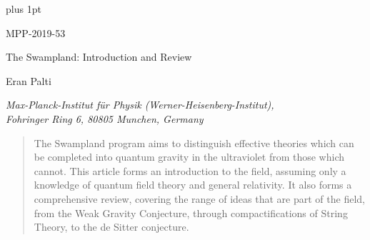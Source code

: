 \documentclass[11pt,a4paper]{article}
\numberwithin{equation}{section}
\numberwithin{table}{section}\setlength{\multlinegap}{25pt}
\begin{document}
\baselineskip=14pt
\parskip 5pt plus 1pt 


\vspace*{-1.5cm}
\begin{flushright}    %
  {\small MPP-2019-53
  }
\end{flushright}

\vspace{2cm}
\begin{center}        %
  {\LARGE The Swampland: Introduction and Review}
\end{center}

\vspace{0.5cm}
\begin{center}        %
{\large Eran Palti}
\end{center}

\vspace{0.15cm}
\begin{center}        %
  \emph{Max-Planck-Institut f\"ur Physik (Werner-Heisenberg-Institut), \\
Fohringer Ring 6, 80805 Munchen, Germany}
             \\[0.15cm]
 
\end{center}

\vspace{2cm}


\startdocument

\begin{abstract}
The Swampland program aims to distinguish effective theories which can be completed into quantum gravity in the ultraviolet from those which cannot. This article forms an introduction to the field, assuming only a knowledge of quantum field theory and general relativity. It also forms a comprehensive review, covering the range of ideas that are part of the field, from the Weak Gravity Conjecture, through compactifications of String Theory, to the de Sitter conjecture. 
\end{abstract}



\thispagestyle{empty}
\clearpage
\end{document}
